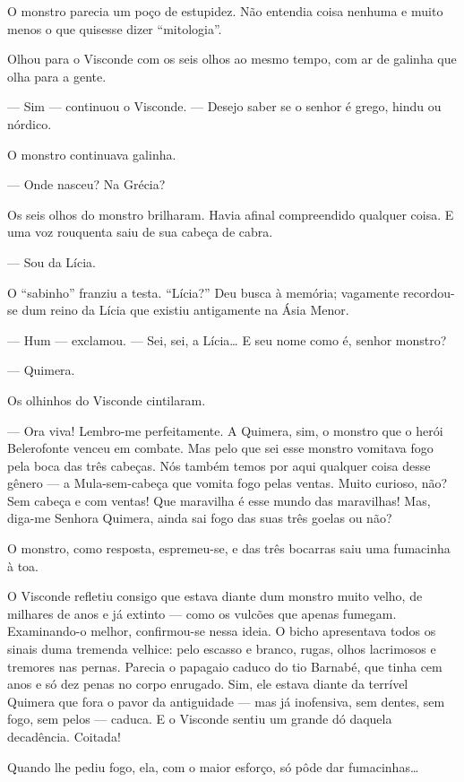 O monstro parecia um poço de estupidez. Não entendia coisa nenhuma e
muito menos o que quisesse dizer ``mitologia''.

Olhou para o Visconde com os seis olhos ao mesmo tempo, com ar de
galinha que olha para a gente.

--- Sim --- continuou o Visconde. --- Desejo saber se o senhor é grego,
hindu ou nórdico.

O monstro continuava galinha.

--- Onde nasceu? Na Grécia?

Os seis olhos do monstro brilharam. Havia afinal compreendido qualquer
coisa. E uma voz rouquenta saiu de sua cabeça de cabra.

--- Sou da Lícia.

O ``sabinho'' franziu a testa. ``Lícia?'' Deu busca à memória; vagamente
recordou-se dum reino da Lícia que existiu antigamente na Ásia Menor.

--- Hum --- exclamou. --- Sei, sei, a Lícia\ldots{} E seu nome como é,
senhor monstro?

--- Quimera.

Os olhinhos do Visconde cintilaram.

--- Ora viva! Lembro-me perfeitamente. A Quimera, sim, o monstro que o
herói Belerofonte venceu em combate. Mas pelo que sei esse monstro
vomitava fogo pela boca das três cabeças. Nós também temos por aqui
qualquer coisa desse gênero --- a Mula-sem-cabeça que vomita fogo pelas
ventas. Muito curioso, não? Sem cabeça e com ventas! Que maravilha é
esse mundo das maravilhas! Mas, diga-me Senhora Quimera, ainda sai fogo
das suas três goelas ou não?

O monstro, como resposta, espremeu-se, e das três bocarras saiu uma
fumacinha à toa.

O Visconde refletiu consigo que estava diante dum monstro muito velho,
de milhares de anos e já extinto --- como os vulcões que apenas fumegam.
Examinando-o melhor, confirmou-se nessa ideia. O bicho apresentava todos
os sinais duma tremenda velhice: pelo escasso e branco, rugas, olhos
lacrimosos e tremores nas pernas. Parecia o papagaio caduco do tio
Barnabé, que tinha cem anos e só dez penas no corpo enrugado. Sim, ele
estava diante da terrível Quimera que fora o pavor da antiguidade ---
mas já inofensiva, sem dentes, sem fogo, sem pelos --- caduca. E o
Visconde sentiu um grande dó daquela decadência. Coitada!

Quando lhe pediu fogo, ela, com o maior esforço, só pôde dar
fumacinhas\ldots{}

